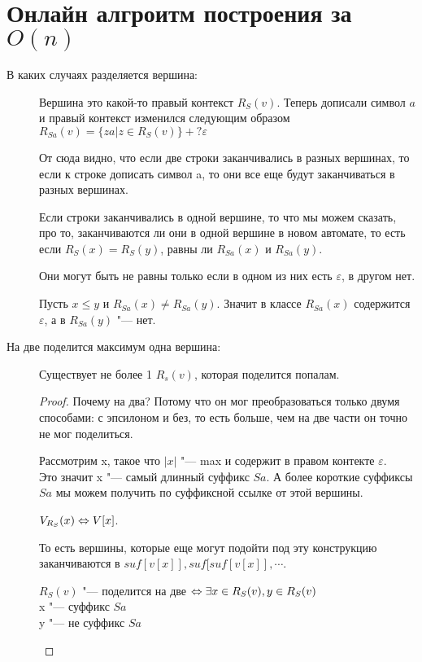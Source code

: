 \section{Онлайн алгроитм построения за $O(n)$}
    \begin{description}
    \item[В каких случаях разделяется вершина:]
    Вершина это какой-то правый контекст $R_{S}(v)$. Теперь дописали символ $a$ и 
    правый контекст изменился следующим образом $R_{Sa}(v) = \{za | z \in R_S(v)\} +? \varepsilon$
    
    От сюда видно, что если две строки заканчивались в разных вершинах, то если к строке дописать символ a, 
    то они все еще будут заканчиваться в разных вершинах.

    Если строки заканчивались в одной вершине, то что мы можем сказать, про то, заканчиваются ли они в
    одной вершине в новом автомате, то есть если $R_{S}(x) = R_{S}(y)$, равны ли $R_{Sa}(x)$ и $R_{Sa}(y)$.

    Они могут быть не равны только если в одном из них есть $\varepsilon$, в другом нет.
    
    Пусть $x \le y$ и $R_{Sa}(x) \ne R_{Sa}(y)$. Значит в классе $R_{Sa}(x)$  содержится $\varepsilon$, 
    а в $R_{Sa}(y)$ "--- нет.
    \item[На две поделится максимум одна вершина:]
    \begin{lemma}
    Существует не более 1 $R_s(v)$, которая поделится попалам.
    \end{lemma}
    \begin{proof}
    Почему на два? Потому что он мог преобразоваться только двумя способами: с эпсилоном и без, то 
    есть больше, чем на две части он точно не мог поделиться. 
    
    
    Рассмотрим x, такое что $|x|$ "--- max и содержит в правом контекте $\varepsilon$.\\
    Это значит x "--- самый длинный суффикс $Sa$. А более короткие суффиксы $Sa$ мы  можем получить 
    по суффиксной ссылке от этой вершины.

    $V_{R_S}(x) \Leftrightarrow V[x]$.

    То есть вершины, которые еще могут подойти под эту конструкцию заканчиваются в $suf[v[x]], suf[suf[v[x]], \cdots$.
    
    \begin{lemma}
    $R_S(v)$ "--- поделится на две $\Leftrightarrow\exists x \in R_S(v), y \in R_S(v)$\\
    x "--- суффикс $Sa$\\
    y "--- не суффикс $Sa$\\
    \end{lemma}
    

\end{proof}
\end{description}
